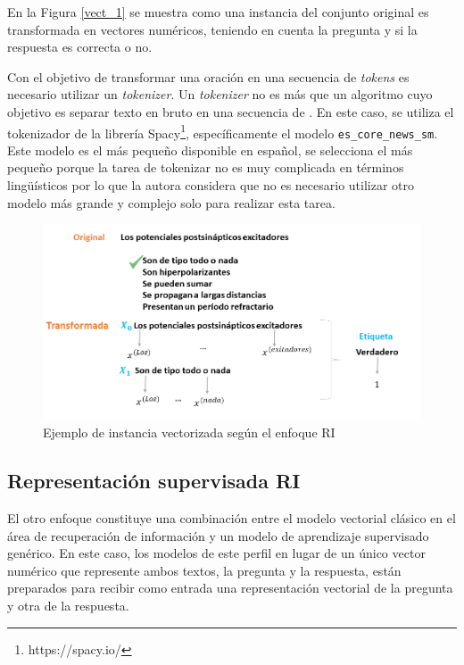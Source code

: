 En la Figura \ref{vect_1} se muestra como una instancia del conjunto original es transformada en vectores numéricos, teniendo en cuenta la pregunta y si la respuesta es correcta o no.

Con el objetivo de transformar una oración en una secuencia de \textit{tokens} es necesario utilizar un \textit{tokenizer}. Un \textit{tokenizer} no es más que un algoritmo cuyo objetivo es separar texto en bruto en una secuencia de . En este caso, se utiliza el tokenizador de la librería Spacy\footnote{https://spacy.io/}, específicamente el modelo \texttt{es\_core\_news\_sm}. Este modelo es el más pequeño disponible en español, se selecciona el más pequeño porque la tarea de tokenizar no es muy complicada en términos lingüísticos por lo que la autora considera que no es necesario utilizar otro modelo más grande y complejo solo para realizar esta tarea.

\begin{figure}[!tb]
  \begin{center}
    \includegraphics[angle=0, width=1\textwidth]{Graphics/vect_2.png}
  \end{center}
    \caption{Ejemplo de instancia vectorizada según el enfoque RI}\label{vect_2}
\end{figure}

\subsection{Representación supervisada RI}

El otro enfoque constituye una combinación entre el modelo vectorial clásico en el área de recuperación de información y un modelo de aprendizaje supervisado genérico.  En este caso, los modelos de este perfil en lugar de un único vector numérico que represente ambos textos, la pregunta y la respuesta, están preparados para recibir como entrada una representación vectorial de la pregunta y otra de la respuesta.


